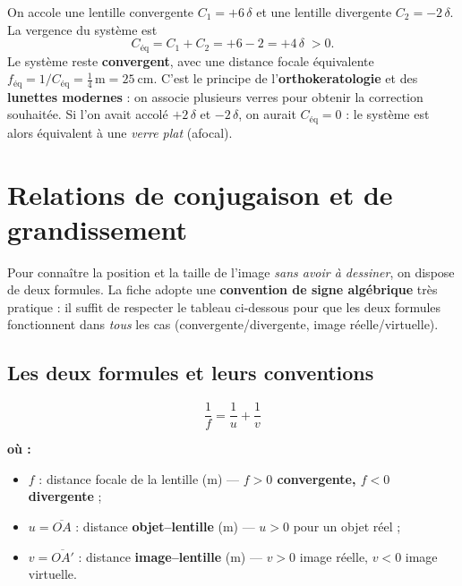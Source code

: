 \documentclass[11pt,a4paper]{article}
\newenvironment{ou}{%
  \par\smallskip\noindent\textbf{où :}\nopagebreak
  \begin{itemize}[leftmargin=1.8em,topsep=2pt,itemsep=1.5pt,parsep=0pt]}%
  {\end{itemize}}
\begin{document}
\begin{exemple}
On accole une lentille convergente $C_1=+6\,\delta$ et une lentille divergente $C_2=-2\,\delta$. La
vergence du système est
\[ C_{\text{éq}}=C_1+C_2=+6-2=+4\,\delta\;>0. \]
Le système reste \textbf{convergent}, avec une distance focale équivalente
$f_{\text{éq}}=1/C_{\text{éq}}=\tfrac{1}{4}\,\si{\metre}=\SI{25}{\centi\metre}$. C'est le principe de
l'\textbf{orthokeratologie} et des \textbf{lunettes modernes} : on associe plusieurs verres pour
obtenir la correction souhaitée. Si l'on avait accolé $+2\,\delta$ et $-2\,\delta$, on aurait
$C_{\text{éq}}=0$ : le système est alors équivalent à une \emph{verre plat} (afocal).
\end{exemple}

\section{Relations de conjugaison et de grandissement}
Pour connaître la position et la taille de l'image \emph{sans avoir à dessiner}, on dispose de deux
formules. La fiche adopte une \textbf{convention de signe algébrique} très pratique : il suffit de
respecter le tableau ci-dessous pour que les deux formules fonctionnent dans \emph{tous} les cas
(convergente/divergente, image réelle/virtuelle).

\subsection{Les deux formules et leurs conventions}

\begin{formule}
\[ \boxed{\;\dfrac{1}{f}=\dfrac{1}{u}+\dfrac{1}{v}\;} \]
\begin{ou}
  \item $f$ : distance focale de la lentille (\si{\metre}) — \textbf{$f>0$ convergente, $f<0$ divergente} ;
  \item $u=\overline{OA}$ : distance \textbf{objet--lentille} (\si{\metre}) — \textbf{$u>0$} pour un
        objet réel ;
  \item $v=\overline{OA'}$ : distance \textbf{image--lentille} (\si{\metre}) — $v>0$ image réelle,
        $v<0$ image virtuelle.
\end{ou}
\end{formule}
\end{document}
